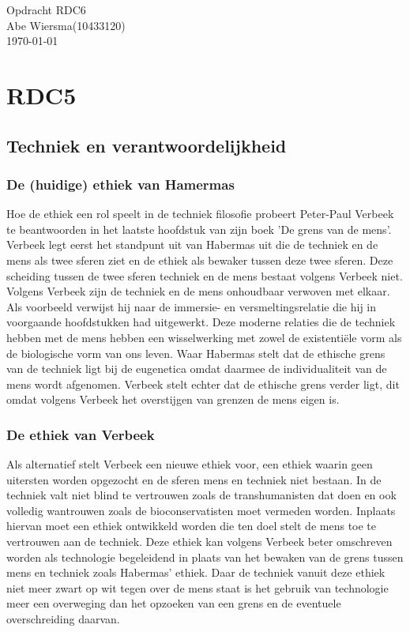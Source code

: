 \documentclass[pdftex,12pt,a4paper]{article}
\begin{document}

\noindent Opdracht RDC6\\ 
Abe Wiersma(10433120)\\
\today
\section*{RDC5}
\subsection{Techniek en verantwoordelijkheid}
\subsubsection{De (huidige) ethiek van Hamermas}
Hoe de ethiek een rol speelt in de techniek filosofie probeert Peter-Paul Verbeek te beantwoorden in het laatste hoofdstuk van zijn boek 'De grens van de mens'. Verbeek legt eerst het standpunt uit van Habermas uit die de techniek en de mens als twee sferen ziet en de ethiek als bewaker tussen deze twee sferen. Deze scheiding tussen de twee sferen techniek en de mens bestaat volgens Verbeek niet. Volgens Verbeek zijn de techniek en de mens onhoudbaar verwoven met elkaar.  Als voorbeeld verwijst hij naar de immersie- en versmeltingsrelatie die hij in voorgaande hoofdstukken had uitgewerkt. Deze moderne relaties die de techniek hebben met de mens hebben een wisselwerking met zowel de existentiële vorm als de biologische vorm van ons leven.
Waar Habermas stelt dat de ethische grens van de techniek ligt bij de eugenetica omdat daarmee de individualiteit van de mens wordt afgenomen. Verbeek stelt echter dat de ethische grens verder ligt, dit omdat volgens Verbeek het overstijgen van grenzen de mens eigen is.
\subsubsection{De ethiek van Verbeek}
Als alternatief stelt Verbeek een nieuwe ethiek voor, een ethiek waarin geen uitersten worden opgezocht en de sferen mens en techniek niet bestaan. In de techniek valt niet blind te vertrouwen zoals de transhumanisten dat doen en ook volledig wantrouwen zoals de bioconservatisten moet vermeden worden. Inplaats hiervan moet een ethiek ontwikkeld worden die ten doel stelt de mens toe te vertrouwen aan de techniek. Deze ethiek kan volgens Verbeek beter omschreven worden als technologie begeleidend in plaats van het bewaken van de grens tussen mens en techniek zoals Habermas' ethiek. Daar de techniek vanuit deze ethiek niet meer zwart op wit tegen over de mens staat is het gebruik van technologie meer een overweging dan het opzoeken van een grens en de eventuele overschreiding daarvan.
\end{document}

